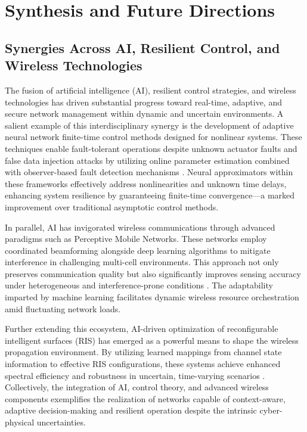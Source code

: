 \documentclass[sigconf]{acmart}
\begin{document}
\section{Synthesis and Future Directions}

\subsection{Synergies Across AI, Resilient Control, and Wireless Technologies}

The fusion of artificial intelligence (AI), resilient control strategies, and wireless technologies has driven substantial progress toward real-time, adaptive, and secure network management within dynamic and uncertain environments. A salient example of this interdisciplinary synergy is the development of adaptive neural network finite-time control methods designed for nonlinear systems. These techniques enable fault-tolerant operations despite unknown actuator faults and false data injection attacks by utilizing online parameter estimation combined with observer-based fault detection mechanisms \cite{ref46}. Neural approximators within these frameworks effectively address nonlinearities and unknown time delays, enhancing system resilience by guaranteeing finite-time convergence—a marked improvement over traditional asymptotic control methods.

In parallel, AI has invigorated wireless communications through advanced paradigms such as Perceptive Mobile Networks. These networks employ coordinated beamforming alongside deep learning algorithms to mitigate interference in challenging multi-cell environments. This approach not only preserves communication quality but also significantly improves sensing accuracy under heterogeneous and interference-prone conditions \cite{ref47}. The adaptability imparted by machine learning facilitates dynamic wireless resource orchestration amid fluctuating network loads.

Further extending this ecosystem, AI-driven optimization of reconfigurable intelligent surfaces (RIS) has emerged as a powerful means to shape the wireless propagation environment. By utilizing learned mappings from channel state information to effective RIS configurations, these systems achieve enhanced spectral efficiency and robustness in uncertain, time-varying scenarios \cite{ref48}. Collectively, the integration of AI, control theory, and advanced wireless components exemplifies the realization of networks capable of context-aware, adaptive decision-making and resilient operation despite the intrinsic cyber-physical uncertainties.
\end{document}
